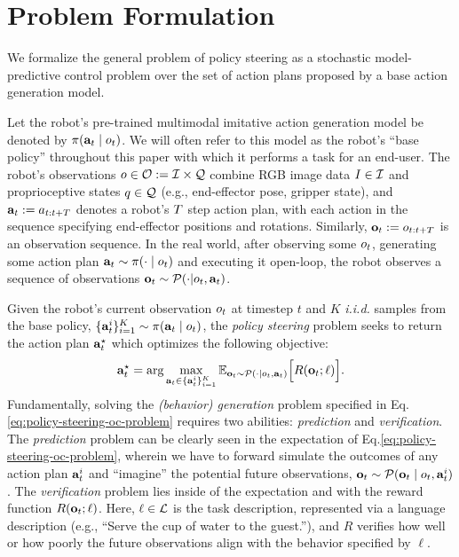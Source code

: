 \section{Problem Formulation}
\label{sec:problem-formulation}

We formalize the general problem of policy steering as a stochastic model-predictive control problem over the set of action plans proposed by a base action generation model. 



Let the robot's pre-trained multimodal imitative action generation model \citep{chi2024diffusionpolicy,leebehavior} be denoted by  $\pi(\mathbf{a}_t\mid o_t)$. We will often refer to this model as the robot's ``base policy'' throughout this paper with which it performs a task for an end-user. 
The robot’s observations $o \in \mathcal{O} := \mathcal{I} \times \mathcal{Q}$ combine RGB image data $I \in \mathcal{I}$ and proprioceptive states $q \in \mathcal{Q}$ (e.g., end-effector pose, gripper state), and $\mathbf{a}_t := a_{t:t+T}$ denotes a robot's $T$ step action plan, with each action in the sequence specifying end-effector positions and rotations. Similarly, $\mathbf{o}_t := o_{t:t+T}$ is an observation sequence. In the real world, after observing some $o_t$, generating some action plan $\mathbf{a}_t \sim \pi(\cdot \mid o_t)$ and executing it open-loop, the robot observes a sequence of observations $\mathbf{o}_t \sim \mathcal{P}(\cdot| o_t, \mathbf{a}_t)$.


 Given the robot's current observation $o_t$ at timestep $t$ and $K$ \textit{i.i.d.} samples from the base policy, $\{\mathbf{a}^i_t\}^K_{i=1} \sim \pi(\mathbf{a}_t\mid o_t)$, the \textit{policy steering} problem seeks to return the action plan $\mathbf{a}^{\star}_t$ which optimizes the following objective:  
\begin{align}
    \mathbf{a}^{\star}_t = \arg\max_{\mathbf{a}_t \in \{\mathbf{a}^i_t\}^K_{i=1}} \mathbb{E}_{\mathbf{o}_t\sim \mathcal{P}(\cdot \mid o_t, \mathbf{a}_t) } \Big[R(\mathbf{o}_t;\ell )\Big].
    \label{eq:policy-steering-oc-problem}
\end{align} 
Fundamentally, solving the \textit{(behavior) generation} problem specified in Eq.\ref{eq:policy-steering-oc-problem} requires two abilities: \textit{prediction} and \textit{verification}. 
The \textit{prediction} problem can be clearly seen in the expectation of Eq.\ref{eq:policy-steering-oc-problem}, wherein we have to forward simulate the outcomes of any action plan $\mathbf{a}^i_t$ and ``imagine'' the potential future observations, $\mathbf{o}_t \sim \mathcal{P}(\mathbf{o}_t \mid o_t, \mathbf{a}^i_t)$. 
The \textit{verification} problem lies inside of the expectation and with the reward function $R(\mathbf{o}_t; \ell)$. 
Here, $\ell \in \mathcal{L}$ is the task description, represented via a language description (e.g., ``Serve the cup of water to the guest.''), and $R$ verifies how well or how poorly the future observations align with the behavior specified by $\ell$.

